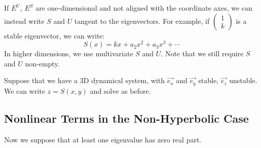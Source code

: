 \documentclass[../Main.tex]{subfiles}
\begin{document}
If $E^U$, $E^S$ are one-dimensional and not aligned with the coordinate axes, we can instead write $S$ and $U$ tangent to the eigenvectors. For example, if $\begin{pmatrix}1 \\ k\end{pmatrix}$ is a stable eigenvector, we can write:
\begin{equation*}
    S(x) = kx + a_2 x^2 + a_3 x^3 + \cdots
\end{equation*}
In higher dimensions, we use multivariate $S$ and $U$. Note that we still require $S$ and $U$ non-empty.
\begin{example}
    Suppose that we have a 3D dynamical system, with $\vec{e_x}$ and $\vec{e_y}$ stable, $\vec{e_z}$ unstable. We can write $z = S(x, y)$ and solve as before.
\end{example}
\subsection{Nonlinear Terms in the Non-Hyperbolic Case}
Now we suppose that at least one eigenvalue has zero real part.
\end{document}
